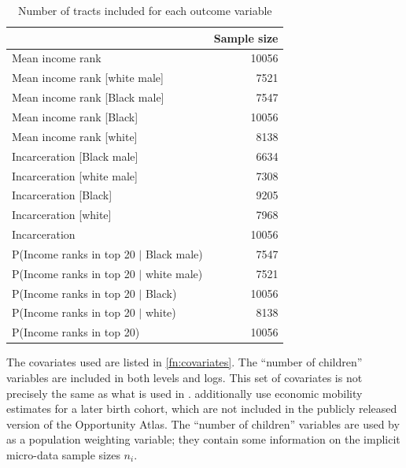 \documentclass[12pt, reqno]{amsart}
\numberwithin{equation}{section}
\begin{document}
\begin{refsection}
\begin{appendices}
\begin{table}[tb]
  \caption{Number of tracts included for each outcome variable}
  \label{tab:sample_sizes}
  \centering

\footnotesize
\begin{tabular}{lr}
\toprule
{} &  Sample size \\
\midrule
Mean income rank                       &        10056 \\
Mean income rank [white male]          &         7521 \\
Mean income rank [Black male]          &         7547 \\
Mean income rank [Black]               &        10056 \\
Mean income rank [white]               &         8138 \\
Incarceration [Black male]             &         6634 \\
Incarceration [white male]             &         7308 \\
Incarceration [Black]                  &         9205 \\
Incarceration [white]                  &         7968 \\
Incarceration                          &        10056 \\
P(Income ranks in top 20 $|$ Black male) &         7547 \\
P(Income ranks in top 20 $|$ white male) &         7521 \\
P(Income ranks in top 20 $|$ Black)      &        10056 \\
P(Income ranks in top 20 $|$ white)      &         8138 \\
P(Income ranks in top 20)              &        10056 \\
\bottomrule
\end{tabular}

\end{table}


The covariates used are listed in \cref{fn:covariates}. The ``number of children''
variables are included in both levels and logs. This set of covariates is not precisely the
same as what is used in \citet{bergman2019creating}. \citet{bergman2019creating}
additionally use economic mobility estimates for a later birth cohort, which are not
included in the publicly released version of the Opportunity Atlas. The ``number of
children'' variables are used by \citep{chetty2018opportunity} as a population weighting
variable; they contain some information on the implicit micro-data sample sizes $n_i$.



\end{appendices}
\end{refsection}
\end{document}
